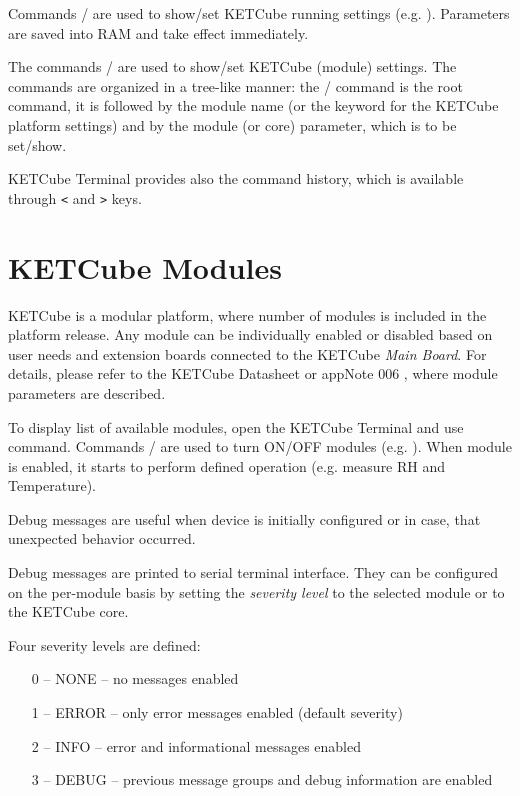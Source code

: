 Commands / are used to show/set KETCube running settings (e.g. ). Parameters are saved into RAM and take effect immediately.

The commands / are used to show/set KETCube (module) settings. The commands are organized in a tree-like manner: the / command is the root command, it is followed by the module name (or the keyword  for the KETCube platform settings) and by the module (or core) parameter, which is to be set/show. 

KETCube Terminal provides also the command history, which is available through {\tt <} and {\tt >} keys.


\clearpage
\section{KETCube Modules}\label{sec:modules}
KETCube is a modular platform, where number of modules is included in the platform release. Any module can be individually enabled or disabled based on user needs and extension boards connected to the KETCube {\it Main Board}. For details, please refer to the KETCube Datasheet \cite{ZCU:KETCube:05-2018} or appNote 006 \cite{ZCU:KETCubeAppNote006:09-2019}, where module parameters are described.

To display list of available modules, open the KETCube Terminal and use  command. Commands / are used to turn ON/OFF modules (e.g. ). When module is enabled, it starts to perform defined operation (e.g. measure RH and Temperature).

Debug messages are useful when device is initially configured or in case, that unexpected behavior occurred.

Debug messages are printed to serial terminal interface. They can be configured on the per-module basis by setting the {\it severity level} to the selected module or to the KETCube core.

Four severity levels are defined:
\begin{itemize}
  \item[0 --] NONE -- no messages enabled
  \item[1 --] ERROR -- only error messages enabled (default severity)
  \item[2 --] INFO -- error and informational messages enabled
  \item[3 --] DEBUG -- previous message groups and debug information are enabled
\end{itemize}

